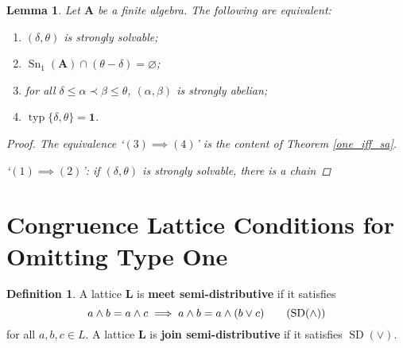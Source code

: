 \documentclass{amsart}
\theoremstyle{plain}
\newtheorem{lemma}[theorem]{Lemma}
\theoremstyle{definition}
\newtheorem{definition}[theorem]{Definition}
\theoremstyle{remark}
\DeclareMathOperator{\typ}{typ}
\DeclareMathOperator{\SD}{SD}
\DeclareMathOperator{\Sn}{Sn}
\begin{document}
\begin{lemma}
    Let $\mathbf{A}$ be a finite algebra. 
    The following are equivalent: 
    \begin{comment}
    \begin{enumerate}
        \item $(\delta, \theta)$ is solvable; 
        \item $\Sn_2(\mathbf{A}) \cap (\theta - \delta) = \emptyset$; 
        \item for all $\delta \le \alpha \prec \beta \le \theta$, $(\alpha, \beta)$ is abelian; 
        \item $\typ\{\delta, \theta\} \subseteq \{\mathbf{1}, \mathbf{2}\}$. 
    \end{enumerate}
\end{comment}
    \begin{enumerate}
        \item $(\delta, \theta)$ is strongly solvable; 
        \item $\Sn_1(\mathbf{A}) \cap (\theta - \delta) = \varnothing$; 
        \item for all $\delta \le \alpha \prec \beta \le \theta$, $(\alpha, \beta)$ is strongly abelian; 
        \item $\typ\{\delta, \theta\} = \mathbf{1}$. 
    \end{enumerate}
    \begin{proof}
        The equivalence `$(3) \implies (4)$' is the content of Theorem \ref{one_iff_sa}. 
        
        `$(1) \implies (2)$': if $(\delta, \theta)$ is strongly solvable, there is a chain 
    \end{proof}
\end{lemma}


\section{Congruence Lattice Conditions for Omitting Type One}
\begin{definition}
    A lattice $\mathbf{L}$ is \textbf{meet semi-distributive} if it satisfies 
    \begin{equation}
        \label{meet_semi_d}
        a \land b = a \land c \implies a \land b = a \land (b \lor c) 
        \tag{$\SD(\land)$}
    \end{equation}
    for all $a,b,c \in L$. 
    A lattice $\mathbf{L}$ is \textbf{join semi-distributive} if it satisfies $\SD(\lor)$. 
\end{definition}
\end{document}
